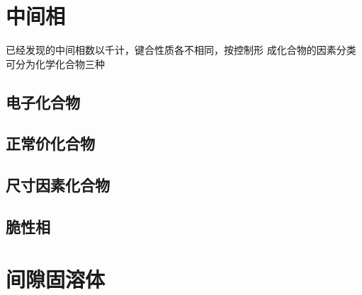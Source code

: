     \section{中间相}
        已经发现的中间相数以千计，键合性质各不相同，按控制形
        成化合物的因素分类可分为化学化合物三种
        \subsection{电子化合物}
        \subsection{正常价化合物}
        \subsection{尺寸因素化合物}
        \subsection{脆性相}
    \section{间隙固溶体}